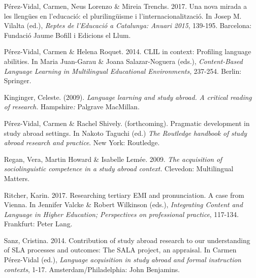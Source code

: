 \begin{styleStandard}
Pérez-Vidal, Carmen, Neus Lorenzo \& Mireia Trenchs. 2017. Una nova mirada a les llengües en l’educació: el plurilingüisme i l’internacionalització. In Josep M. Vilalta (ed.), \textit{Reptes de l’Educació a Catalunya: Anuari 2015}, 139-195. Barcelona: Fundació Jaume Bofill i Edicions el Llum.
\end{styleStandard}


\begin{styleStandard}
Pérez-Vidal, Carmen \& Helena Roquet. 2014. CLIL in context: Profiling language abilities. In Maria Juan-Garau \& Joana Salazar-Noguera (eds.), \textit{Content-Based Language Learning in Multilingual Educational Environments, }237-254. Berlin: Springer.
\end{styleStandard}


\begin{styleStandard}
Kinginger, Celeste. (2009). \textit{Language learning and study abroad. A critical reading of research. }Hampshire\textit{: }Palgrave MacMillan.
\end{styleStandard}


\begin{styleStandard}
Pérez-Vidal, Carmen \& Rachel Shively. (forthcoming). Pragmatic development in study abroad settings. In Nakoto Taguchi (ed.) \textit{The Routledge handbook of study abroad research and practice}. New York: Routledge.
\end{styleStandard}


\begin{styleStandard}
Regan, Vera, Martin Howard \& Isabelle Lemée. 2009. \textit{The acquisition of sociolinguistic competence in a study abroad context. }Clevedon: Multilingual Matters.
\end{styleStandard}


\begin{styleStandard}
Ritcher, Karin. 2017. Researching tertiary EMI and pronunciation. A case from Vienna. In Jennifer Valcke \& Robert Wilkinson (eds.), \textit{Integrating Content and Language in Higher Education; Perspectives on professional practice}, 117-134. Frankfurt: Peter Lang. 
\end{styleStandard}


\begin{styleStandard}
Sanz, Cristina. 2014. Contribution of study abroad research to our understanding of SLA processes and outcomes: The SALA project, an appraisal. In Carmen Pérez-Vidal (ed.), \textit{Language acquisition in study abroad and formal instruction contexts}, 1-17. Amsterdam/Philadelphia: John Benjamins.
\end{styleStandard}


